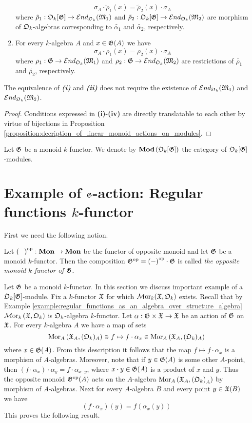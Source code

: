 \begin{proposition}
\begin{enumerate}[label=\emph{\textbf{(\roman*)}}, leftmargin=1.5em]
$$\sigma_A \cdot \tilde{\rho}_1(x) = \tilde{\rho}_2(x) \cdot \sigma_A$$
where $\tilde{\rho}_1:{\mathfrak O}_k[{\mathfrak G}] \rightarrow {\mathcal E} nd_{{\mathfrak O}_k}({\mathfrak M}_1)$ and $\tilde{\rho}_2:{\mathfrak O}_k[{\mathfrak G}] \rightarrow {\mathcal E} nd_{{\mathfrak O}_k}({\mathfrak M}_2)$ are morphism of ${\mathfrak O}_k$-algebras corresponding to $\tilde{\alpha_1}$ and $\tilde{\alpha_2}$, respectively.
\item For every $k$-algebra $A$ and $x\in {\mathfrak G}(A)$ we have
$$\sigma_A \cdot \rho_1(x) = \rho_2(x) \cdot \sigma_A$$
where $\rho_1:{\mathfrak G} \rightarrow {\mathcal E} nd_{{\mathfrak O}_k}({\mathfrak M}_1)$ and $\rho_2:{\mathfrak G} \rightarrow {\mathcal E} nd_{{\mathfrak O}_k}({\mathfrak M}_2)$ are restrictions of $\tilde{\rho_1}$ and $\tilde{\rho_2}$, respectively.
\end{enumerate}
The equivalence of \emph{\textbf{(i)}} and \emph{\textbf{(ii)}} does not require the existence of ${\mathcal E} nd_{{\mathfrak O}_k}({\mathfrak M}_1)$ and ${\mathcal E} nd_{{\mathfrak O}_k}({\mathfrak M}_2)$.
\end{proposition}
\begin{proof}
Conditions expressed in \textbf{(i)}-\textbf{(iv)} are directly translatable to each other by virtue of bijections in Proposition \ref{proposition:decription_of_linear_monoid_actions_on_modules}. 
\end{proof}
\noindent
Let ${\mathfrak G}$ be a monoid $k$-functor. We denote by $\mathbf{Mod}\left({\mathfrak O}_k[{\mathfrak G}]\right)$ the category of ${\mathfrak O}_k[{\mathfrak G}]$-modules.

\section{Example of ${\mathfrak G}$-action: Regular functions $k$-functor}
\noindent
First we need the following notion.

\begin{definition}
Let $\left(-\right)^{\mathrm{op}}:\mathbf{Mon} \rightarrow \mathbf{Mon}$ be the functor of opposite monoid and let ${\mathfrak G}$ be a monoid $k$-functor. Then the composition ${\mathfrak G}^{\mathrm{op}} = \left(-\right)^{\mathrm{op}}\cdot {\mathfrak G}$ is called \textit{the opposite monoid $k$-functor of ${\mathfrak G}$}.
\end{definition}
\noindent
Let ${\mathfrak G}$ be a monoid $k$-functor. In this section we discuss important example of a ${\mathfrak O}_k[{\mathfrak G}]$-module. Fix a $k$-functor ${\mathfrak X}$ for which $\mathcal{M}\mathrm{or}_k({\mathfrak X},{\mathfrak O}_k)$ exists. Recall that by Example \ref{example:regular_functions_as_an_algebra_over_structure_algebra} $\mathcal{M}\mathrm{or}_k\left({\mathfrak X},{\mathfrak O}_k\right)$ is ${\mathfrak O}_k$-algebra $k$-functor. Let $\alpha:{\mathfrak G}\times {\mathfrak X}\rightarrow {\mathfrak X}$ be an action of ${\mathfrak G}$ on ${\mathfrak X}$. For every $k$-algebra $A$  we have a map of sets
$$\mathrm{Mor}_A\left({\mathfrak X}_A,({\mathfrak O}_k)_A\right) \ni f\mapsto f\cdot \alpha_x\in \mathrm{Mor}_A\left({\mathfrak X}_A,({\mathfrak O}_k)_A\right)$$
where $x\in {\mathfrak G}(A)$. From this description it follows that the map $f\mapsto f\cdot \alpha_x$ is a morphism of $A$-algebras. Moreover, note that if $y\in {\mathfrak G}(A)$ is some other $A$-point, then $\left(f\cdot \alpha_x\right)\cdot \alpha_y = f\cdot \alpha_{x\cdot y}$, where $x\cdot y \in {\mathfrak G}(A)$ is a product of $x$ and $y$. Thus the opposite monoid ${\mathfrak G}^{\mathrm{op}}(A)$ acts on the $A$-algebra $\mathrm{Mor}_A\left({\mathfrak X}_A,\left({\mathfrak O}_k\right)_A\right)$ by morphism of $A$-algebras. Next for every $A$-algebra $B$ and every point $y\in {\mathfrak X}(B)$ we have
$$(f\cdot \alpha_x)(y) = f\left(\alpha_x(y)\right)$$
This proves the following result.

